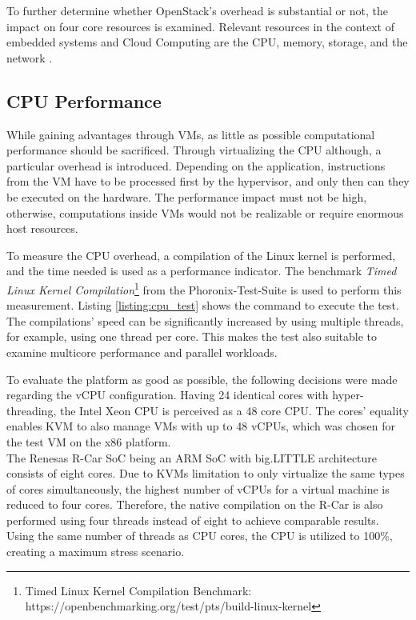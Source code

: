         To further determine whether OpenStack's overhead is substantial or not, the impact on four core resources is examined.   
        Relevant resources in the context of embedded systems and Cloud Computing are the \ac{CPU}, memory, storage, and the network \cite{Gillam2013,Kominos2017,Kang2017,Vedam2012,Tesfatsion2018}.
       
        \subsection{CPU Performance}
        \label{subsection:methodology_cpu}
        
            While gaining advantages through \acp{VM}, as little as possible computational performance should be sacrificed.
            Through virtualizing the \ac{CPU} although, a particular overhead is introduced.
            Depending on the application, instructions from the \ac{VM} have to be processed first by the hypervisor, and only then can they be executed on the hardware.
            The performance impact must not be high, otherwise, computations inside \acp{VM} would not be realizable or require enormous host resources.
            
            \noindent To measure the \ac{CPU} overhead, a compilation of the Linux kernel is performed, and the time needed is used as a performance indicator.
            The benchmark \textsl{Timed Linux Kernel Compilation}\footnote{Timed Linux Kernel Compilation Benchmark: https://openbenchmarking.org/test/pts/build-linux-kernel} from the Phoronix-Test-Suite is used to perform this measurement.
            Listing \ref{listing:cpu_test} shows the command to execute the test.
            The compilations' speed can be significantly increased by using multiple threads, for example, using one thread per core.
            This makes the test also suitable to examine multicore performance and parallel workloads.
            
            \noindent To evaluate the platform as good as possible, the following decisions were made regarding the \ac{vCPU} configuration.
            Having 24 identical cores with hyper-threading, the Intel Xeon CPU is perceived as a 48 core \ac{CPU}.
            The cores' equality enables \ac{KVM} to also manage VMs with up to 48 \acp{vCPU}, which was chosen for the test VM on the x86 platform. \\
            The Renesas R-Car \ac{SoC} being an ARM SoC with big.LITTLE architecture consists of eight cores.
            Due to \acp{KVM} limitation to only virtualize the same types of cores simultaneously, the highest number of \acp{vCPU} for a virtual machine is reduced to four cores.
            Therefore, the native compilation on the R-Car is also performed using four threads instead of eight to achieve comparable results.
            Using the same number of threads as CPU cores, the CPU is utilized to 100\%, creating a maximum stress scenario.            
            
